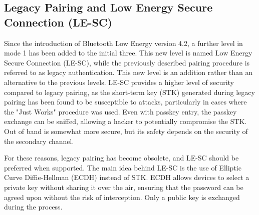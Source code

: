 \documentclass{Configuration_Files/PoliMi3i_thesis}
\begin{document}
\subsection{Legacy Pairing and Low Energy Secure Connection (LE-SC)}

Since the introduction of Bluetooth Low Energy version 4.2, a further level in mode 1 has been added to the initial three. This new level is named Low Energy Secure Connection (LE-SC), while the previously described pairing procedure is referred to as legacy authentication. This new level is an addition rather than an alternative to the previous levels. LE-SC provides a higher level of security compared to legacy pairing, as the short-term key (STK) generated during legacy pairing has been found to be susceptible to attacks, particularly in cases where the "Just Works" procedure was used. Even with passkey entry, the passkey exchange can be sniffed, allowing a hacker to potentially compromise the STK. Out of band is somewhat more secure, but its safety depends on the security of the secondary channel.

For these reasons, legacy pairing has become obsolete, and LE-SC should be preferred when supported. The main idea behind LE-SC is the use of Elliptic Curve Diffie-Hellman (ECDH) instead of STK. ECDH allows devices to select a private key without sharing it over the air, ensuring that the password can be agreed upon without the risk of interception. Only a public key is exchanged during the process.
\end{document}
